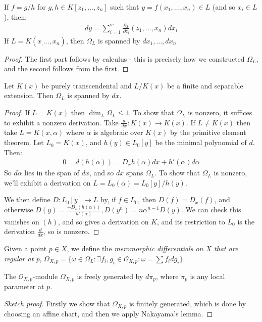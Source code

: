 \documentclass[10pt,a4paper,rgb]{article}
\begin{document}
\begin{lemma}
If $f = g/h$ for $g, h \in K[z_1, \ldots, z_n]$ such that $y = f(x_1, \ldots, x_n) \in L$ (and so $x_i \in L$), then:
\begin{align*}
dy = \sum_{i=1}^w \frac{\partial f}{\partial z_i}(z_1, \ldots, x_n) dx_i
\end{align*}
If $L = K(x_, \ldots, x_n)$, then $\Omega_L$ is spanned by $dx_1, \ldots, dx_n$
\end{lemma}
\begin{proof}
The first part follows by calculus - this is precisely how we constructed $\Omega_L$, and the second follows from the first.
\end{proof}
\begin{lemma}
Let $K(x)$ be purely transcendental and $L/K(x)$ be a finite and separable extension. Then $\Omega_L$ is spanned by $dx$.
\end{lemma}
\begin{proof}
If $L = K(x)$ then $\dim_L \Omega_L \leq 1$. To show that $\Omega_L$ is nonzero, it suffices to exhibit a nonzero derivation. Take $\frac{d}{dx}:K(x) \to K(x)$. If $L \neq K(x)$ then take $L = K(x, \alpha)$ where $\alpha$ is algebraic over $K(x)$ by the primitive element theorem. Let $L_0 = K(x)$, and $h(y) \in L_0[y]$ be the minimal polynomial of $d$. Then:
\begin{align*}
0 = d(h(\alpha)) = D_x h(\alpha)dx + h'(\alpha) d\alpha
\end{align*}
So $d\alpha$ lies in the span of $dx$, and so $dx$ spans $\Omega_L$. To show that $\Omega_L$ is nonzero, we'll exhibit a derivation on $L = L_0(\alpha) = L_0[y]/h(y)$.

We then define $D: L_0[y] \to L$ by, if $f \in L_0$, then $D(f) = D_x(f)$, and otherwise $D(y) = \frac{-D_x(h(\alpha))}{h'(\alpha)}, D(y^n) = n\alpha^{n-1}D(y)$. We can check this vanishes on $(h)$, and so gives a derivation on $K$, and its restriction to $L_0$ is the derivation $\frac{d}{dx}$, so is nonzero.
\end{proof}
Given a point $p \in X$, we define the \emph{meromorphic differentials on $X$ that are regular at p}, $\Omega_{X,p} = \{\omega \in \Omega_L : \exists f_i, g_i \in \mathcal{O}_{X,p}: \omega = \sum f_i dg_i\}$.
\begin{proposition}
The $\mathcal{O}_{X,p}$-module $\Omega_{X,p}$ is freely generated by $d\pi_p$, where $\pi_p$ is any local parameter at $p$.
\end{proposition}
\begin{proof}[Sketch proof]
Firstly we show that $\Omega_{X,p}$ is finitely generated, which is done by choosing an affine chart, and then we apply Nakayama's lemma.
\end{proof}
\end{document}
